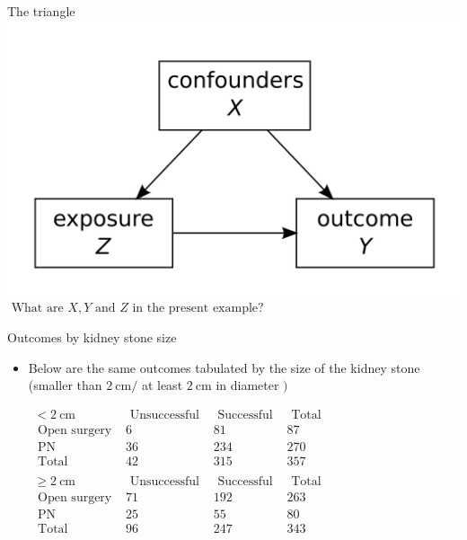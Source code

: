 \documentclass[10pt,handout]{beamer}\usepackage[]{graphicx}\usepackage[]{color}
\begin{document}
\begin{frame}{The triangle}
\centering
\includegraphics[width=\linewidth]{triangle.png}
\vspace{0.3in}
$\text { What are } X, Y \text { and } Z \text { in the present example? }$
\end{frame}


\begin{frame}{Outcomes by kidney stone size}
	\begin{itemize}
		\item Below are the same outcomes tabulated by the size of the kidney stone (smaller than $2 \mathrm{~cm} /$ at least $2 \mathrm{~cm}$ in diameter $)$
		
		\vspace{0.2in}
		
		
$\begin{array}{lccc}
	<2 \mathrm{~cm} & \text { Unsuccessful } & \text { Successful } & \text { Total } \\
	\text { Open surgery } & 6 & 81 & 87 \\
	\text { PN } & 36 & 234 & 270 \\
	\text { Total } & 42 & 315 & 357 \\
	& & & \\
	\geq 2 \mathrm{~cm} & \text { Unsuccessful } & \text { Successful } & \text { Total } \\
	\text { Open surgery } & 71 & 192 & 263 \\
	\text { PN } & 25 & 55 & 80 \\
	\text { Total } & 96 & 247 & 343
\end{array}$
	\end{itemize}
\end{frame}
\end{document}
